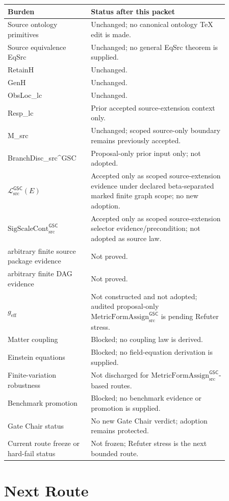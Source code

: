 \documentclass[11pt]{article}
\newcommand{\MetricData}{\mathcal{L}_{\mathrm{src}}^{\mathsf{GSC}}}
\newcommand{\geff}{g_{\mathrm{eff}}}
\newcommand{\SigScaleCont}{\mathrm{SigScaleCont}_{\mathrm{src}}^{\mathsf{GSC}}}
\newcommand{\MetricFormAssign}{\mathrm{MetricFormAssign}_{\mathrm{src}}^{\mathsf{GSC}}}
\begin{document}
\begin{longtable}{p{0.30\linewidth}p{0.56\linewidth}}
\toprule
Burden & Status after this packet \\
\midrule
Source ontology primitives & Unchanged; no canonical ontology TeX edit is
made. \\
Source equivalence EqSrc & Unchanged; no general EqSrc theorem is supplied. \\
RetainH & Unchanged. \\
GenH & Unchanged. \\
ObsLoc\_lc & Unchanged. \\
Resp\_lc & Prior accepted source-extension context only. \\
M\_src & Unchanged; scoped source-only boundary remains previously accepted. \\
BranchDisc\_src\textasciicircum GSC & Proposal-only prior input only; not
adopted. \\
\(\MetricData(E)\) & Accepted only as scoped source-extension evidence under
declared beta-separated marked finite graph scope; no new adoption. \\
\(\SigScaleCont\) & Accepted only as scoped source-extension selector
evidence/precondition; not adopted as source law. \\
arbitrary finite source package evidence & Not proved. \\
arbitrary finite DAG evidence & Not proved. \\
\(\geff\) & Not constructed and not adopted; audited proposal-only
\(\MetricFormAssign\) is pending Refuter stress. \\
Matter coupling & Blocked; no coupling law is derived. \\
Einstein equations & Blocked; no field-equation derivation is supplied. \\
Finite-variation robustness & Not discharged for \(\MetricFormAssign\)-based
routes. \\
Benchmark promotion & Blocked; no benchmark evidence or promotion is supplied. \\
Gate Chair status & No new Gate Chair verdict; adoption remains protected. \\
Current route freeze or hard-fail status & Not frozen; Refuter stress is the
next bounded route. \\
\bottomrule
\end{longtable}

\section{Next Route}
\end{document}
